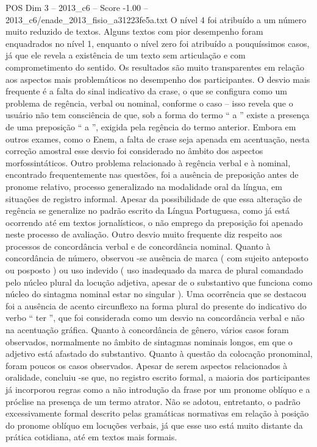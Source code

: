 \begin{textsample}{POS Dim 3 – 2013\_c6 – Score -1.00 – 2013\_c6/enade\_2013\_fisio\_a31223fe5a.txt}
O nível 4 foi atribuído a um número muito reduzido de textos.
Alguns textos com pior desempenho foram enquadrados no nível 1, enquanto o nível zero foi atribuído a pouquíssimos casos, já que ele revela a existência de um texto sem articulação e com comprometimento do sentido.
Os resultados são muito transparentes em relação aos aspectos mais problemáticos no desempenho dos participantes.
O desvio mais frequente é a falta do sinal indicativo da crase, o que se configura como um problema de regência, verbal ou nominal, conforme o caso – isso revela que o usuário não tem consciência de que, sob a forma do termo “ a ” existe a presença de uma preposição “ a ”, exigida pela regência do termo anterior.
Embora em outros exames, como o Enem, a falta de crase seja apenada em acentuação, nesta correção amostral esse desvio foi considerado no âmbito dos aspectos morfossintáticos.
Outro problema relacionado à regência verbal e à nominal, encontrado frequentemente nas questões, foi a ausência de preposição antes de pronome relativo, processo generalizado na modalidade oral da língua, em situações de registro informal.
Apesar da possibilidade de que essa alteração de regência se generalize no padrão escrito da Língua Portuguesa, como já está ocorrendo até em textos jornalísticos, o não emprego da preposição foi apenado neste processo de avaliação.
Outro desvio muito frequente diz respeito aos processos de concordância verbal e de concordância nominal.
Quanto à concordância de número, observou -se ausência de marca ( com sujeito anteposto ou posposto ) ou uso indevido ( uso inadequado da marca de plural comandado pelo núcleo plural da locução adjetiva, apesar de o substantivo que funciona como núcleo do sintagma nominal estar no singular ).
Uma ocorrência que se destacou foi a ausência de acento circunflexo na forma plural do presente do indicativo do verbo “ ter ”, que foi considerada como um desvio na concordância verbal e não na acentuação gráfica.
Quanto à concordância de gênero, vários casos foram observados, normalmente no âmbito de sintagmas nominais longos, em que o adjetivo está afastado do substantivo.
Quanto à questão da colocação pronominal, foram poucos os casos observados.
Apesar de serem aspectos relacionados à oralidade, concluiu -se que, no registro escrito formal, a maioria dos participantes já incorporou regras como a não introdução da frase por um pronome oblíquo e a próclise na presença de um termo atrator.
Não se adotou, entretanto, o padrão excessivamente formal descrito pelas gramáticas normativas em relação à posição do pronome oblíquo em locuções verbais, já que esse uso está muito distante da prática cotidiana, até em textos mais formais.

\end{textsample}
